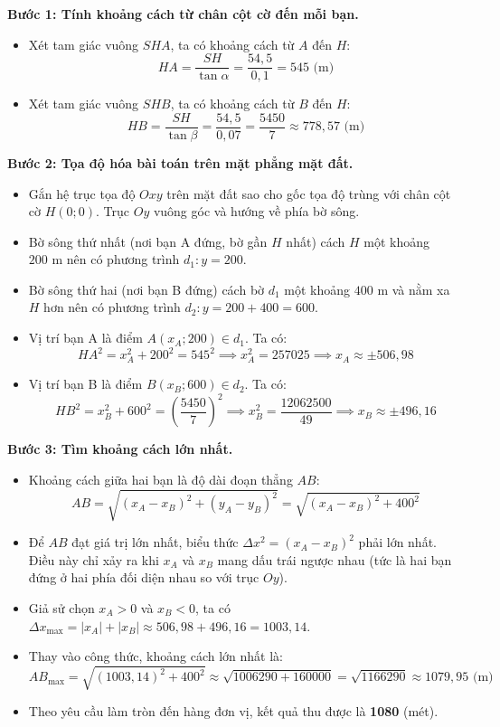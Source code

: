 \documentclass[12pt,a4paper]{article}
\begin{document}
\begin{ex}
{\begin{apdungbox}
\textbf{Bước 1: Tính khoảng cách từ chân cột cờ đến mỗi bạn.}
\begin{itemize}
    \item Xét tam giác vuông $SHA$, ta có khoảng cách từ $A$ đến $H$:
    \[ HA = \dfrac{SH}{\tan\alpha} = \dfrac{54{,}5}{0{,}1} = 545 \text{ (m)} \]
    \item Xét tam giác vuông $SHB$, ta có khoảng cách từ $B$ đến $H$:
    \[ HB = \dfrac{SH}{\tan\beta} = \dfrac{54{,}5}{0{,}07} = \dfrac{5450}{7} \approx 778{,}57 \text{ (m)} \]
\end{itemize}

\textbf{Bước 2: Tọa độ hóa bài toán trên mặt phẳng mặt đất.}
\begin{itemize}
    \item Gắn hệ trục tọa độ $Oxy$ trên mặt đất sao cho gốc tọa độ trùng với chân cột cờ $H(0;0)$. Trục $Oy$ vuông góc và hướng về phía bờ sông.
    \item Bờ sông thứ nhất (nơi bạn A đứng, bờ gần $H$ nhất) cách $H$ một khoảng $200\text{ m}$ nên có phương trình $d_1 \colon y = 200$.
    \item Bờ sông thứ hai (nơi bạn B đứng) cách bờ $d_1$ một khoảng $400\text{ m}$ và nằm xa $H$ hơn nên có phương trình $d_2 \colon y = 200 + 400 = 600$.
    \item Vị trí bạn A là điểm $A(x_A; 200) \in d_1$. Ta có:
    \[ HA^2 = x_A^2 + 200^2 = 545^2 \implies x_A^2 = 257025 \implies x_A \approx \pm 506{,}98 \]
    \item Vị trí bạn B là điểm $B(x_B; 600) \in d_2$. Ta có:
    \[ HB^2 = x_B^2 + 600^2 = \left(\dfrac{5450}{7}\right)^2 \implies x_B^2 = \dfrac{12062500}{49} \implies x_B \approx \pm 496{,}16 \]
\end{itemize}

\textbf{Bước 3: Tìm khoảng cách lớn nhất.}
\begin{itemize}
    \item Khoảng cách giữa hai bạn là độ dài đoạn thẳng $AB$:
    \[ AB = \sqrt{(x_A - x_B)^2 + (y_A - y_B)^2} = \sqrt{(x_A - x_B)^2 + 400^2} \]
    \item Để $AB$ đạt giá trị lớn nhất, biểu thức $\Delta x^2 = (x_A - x_B)^2$ phải lớn nhất. Điều này chỉ xảy ra khi $x_A$ và $x_B$ mang dấu trái ngược nhau (tức là hai bạn đứng ở hai phía đối diện nhau so với trục $Oy$).
    \item Giả sử chọn $x_A > 0$ và $x_B < 0$, ta có $\Delta x_{\max} = |x_A| + |x_B| \approx 506{,}98 + 496{,}16 = 1003{,}14$.
    \item Thay vào công thức, khoảng cách lớn nhất là:
    \[ AB_{\max} = \sqrt{(1003{,}14)^2 + 400^2} \approx \sqrt{1006290 + 160000} = \sqrt{1166290} \approx 1079{,}95 \text{ (m)} \]
    \item Theo yêu cầu làm tròn đến hàng đơn vị, kết quả thu được là \textbf{1080} (mét).
\end{itemize}
\end{apdungbox}
}
\end{ex}
\end{document}
